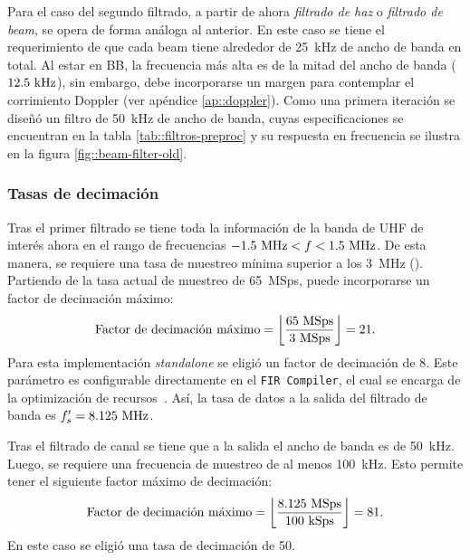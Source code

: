 \documentclass[../../main.tex]{subfiles}
\begin{document}
Para el caso del segundo filtrado, a partir de ahora \textit{filtrado de haz} o \textit{filtrado de beam}, se opera de forma análoga al anterior. En este caso se tiene el requerimiento de que cada beam tiene alrededor de 25~kHz de ancho de banda en total. Al estar en BB, la frecuencia más alta es de la mitad del ancho de banda ($12.5~\textrm{kHz}$), sin embargo, debe incorporarse un margen para contemplar el corrimiento Doppler (ver apéndice \ref{ap::doppler}). Como una primera iteración se diseñó un filtro de 50~kHz de ancho de banda, cuyas especificaciones se encuentran en la tabla \ref{tab::filtros-preproc} y su respuesta en frecuencia se ilustra en la figura \ref{fig::beam-filter-old}.


\subsubsection{Tasas de decimación}
Tras el primer filtrado se tiene toda la información de la banda de UHF de interés ahora en el rango de frecuencias $-1.5~\textrm{MHz}<f<1.5~\textrm{MHz}$. De esta manera, se requiere una tasa de muestreo mínima superior a los 3~MHz (\cite{teorema-del-muestreo}). Partiendo de la tasa actual de muestreo de 65~MSps, puede incorporarse un factor de decimación máximo:
\[\textrm{Factor de decimación máximo} = \left\lfloor\frac{65~\textrm{MSps}}{3~\textrm{MSps}}\right\rfloor = 21.\]
Para esta implementación \textit{standalone} se eligió un factor de decimación de 8. Este parámetro es configurable directamente en el \texttt{FIR Compiler}, el cual se encarga de la optimización de recursos~\cite{fir-compiler}. Así, la tasa de datos a la salida del filtrado de banda es $f'_s = 8.125~\textrm{MHz}$.

Tras el filtrado de canal se tiene que a la salida el ancho de banda es de 50~kHz. Luego, se requiere una frecuencia de muestreo de al menos 100~kHz. Esto permite tener el siguiente factor máximo de decimación:
\[\textrm{Factor de decimación máximo} = \left\lfloor\frac{8.125~\textrm{MSps}}{100~\textrm{kSps}}\right\rfloor = 81.\] En este caso se eligió una tasa de decimación de 50.
\end{document}
